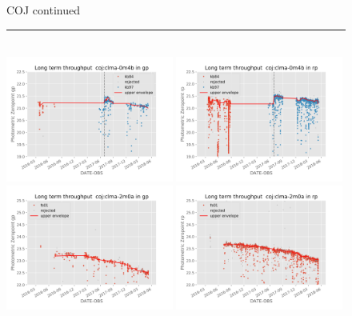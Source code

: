 \documentclass[]{spie}
\begin{document}
\begin{figure}\ContinuedFloat
\centering 
COJ continued \\ 
\rule{\textwidth}{0.4pt} \\
\includegraphics[width=0.49\textwidth]{images/photzptrend-coj-clma-0m4b-gp.png} \hspace*{\fill}
\includegraphics[width=0.49\textwidth]{images/photzptrend-coj-clma-0m4b-rp.png} \\
\includegraphics[width=0.49\textwidth]{images/photzptrend-coj-clma-2m0a-gp.png} \hspace*{\fill}
\includegraphics[width=0.49\textwidth]{images/photzptrend-coj-clma-2m0a-rp.png} \\ 

\end{figure}
\end{document}
